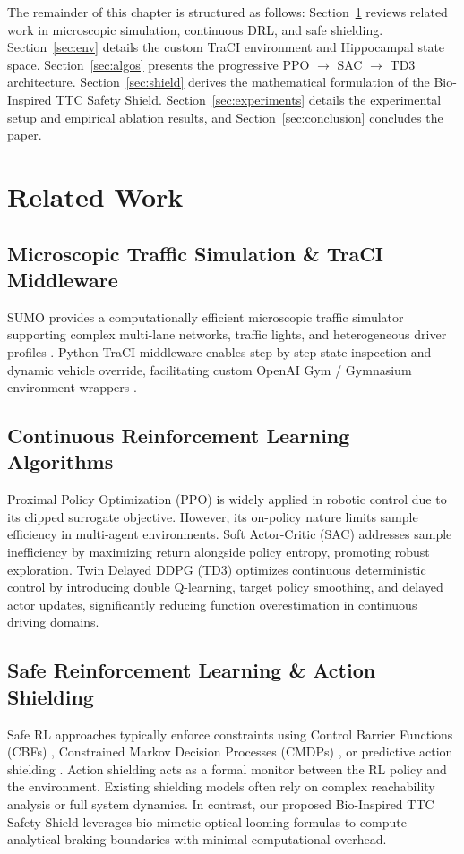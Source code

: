 \documentclass{svproc}
\begin{document}
The remainder of this chapter is structured as follows: Section~\ref{sec:related} reviews related work in microscopic simulation, continuous DRL, and safe shielding. Section~\ref{sec:env} details the custom TraCI environment and Hippocampal state space. Section~\ref{sec:algos} presents the progressive PPO $\rightarrow$ SAC $\rightarrow$ TD3 architecture. Section~\ref{sec:shield} derives the mathematical formulation of the Bio-Inspired TTC Safety Shield. Section~\ref{sec:experiments} details the experimental setup and empirical ablation results, and Section~\ref{sec:conclusion} concludes the paper.

\section{Related Work}\label{sec:related}
\subsection{Microscopic Traffic Simulation \& TraCI Middleware}
SUMO provides a computationally efficient microscopic traffic simulator supporting complex multi-lane networks, traffic lights, and heterogeneous driver profiles \cite{krajzewicz2012recent}. Python-TraCI middleware enables step-by-step state inspection and dynamic vehicle override, facilitating custom OpenAI Gym / Gymnasium environment wrappers \cite{towers2023gymnasium}.

\subsection{Continuous Reinforcement Learning Algorithms}
Proximal Policy Optimization (PPO) \cite{schulman2017proximal} is widely applied in robotic control due to its clipped surrogate objective. However, its on-policy nature limits sample efficiency in multi-agent environments. Soft Actor-Critic (SAC) \cite{haarnoja2018soft} addresses sample inefficiency by maximizing return alongside policy entropy, promoting robust exploration. Twin Delayed DDPG (TD3) \cite{fujimoto2018addressing} optimizes continuous deterministic control by introducing double Q-learning, target policy smoothing, and delayed actor updates, significantly reducing function overestimation in continuous driving domains.

\subsection{Safe Reinforcement Learning \& Action Shielding}
Safe RL approaches typically enforce constraints using Control Barrier Functions (CBFs) \cite{ames2019control}, Constrained Markov Decision Processes (CMDPs) \cite{altman1999constrained}, or predictive action shielding \cite{alshiekh2018safe}. Action shielding acts as a formal monitor between the RL policy and the environment. Existing shielding models often rely on complex reachability analysis or full system dynamics. In contrast, our proposed Bio-Inspired TTC Safety Shield leverages bio-mimetic optical looming formulas to compute analytical braking boundaries with minimal computational overhead.
\end{document}
